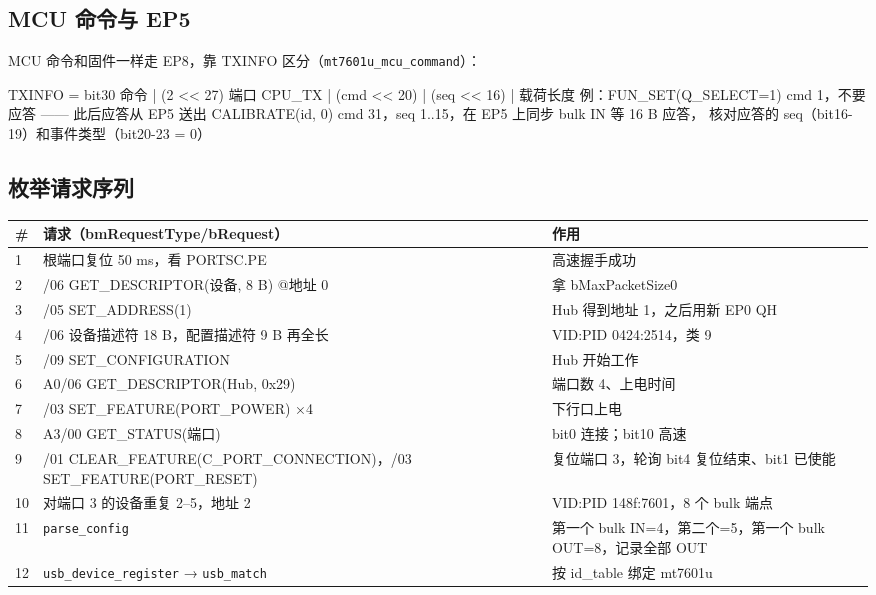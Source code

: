 \documentclass[UTF8,zihao=-4,fontset=none]{ctexart}
\newcommand{\fn}[1]{\texttt{#1}}
\begin{document}
\subsection{MCU 命令与 EP5}

MCU 命令和固件一样走 EP8，靠 TXINFO 区分（\fn{mt7601u\_mcu\_command}）：
\begin{code}
TXINFO = bit30 命令 | (2 << 27) 端口 CPU_TX | (cmd << 20) | (seq << 16) | 载荷长度
例：FUN_SET(Q_SELECT=1)   cmd 1，不要应答 —— 此后应答从 EP5 送出
    CALIBRATE(id, 0)      cmd 31，seq 1..15，在 EP5 上同步 bulk IN 等 16 B 应答，
                          核对应答的 seq（bit16-19）和事件类型（bit20-23 = 0）
\end{code}

\subsection{枚举请求序列}

\begin{longtable}{p{6mm}>{\raggedright\arraybackslash}p{72mm}>{\raggedright\arraybackslash}p{66mm}}
\toprule
\# & 请求（bmRequestType/bRequest） & 作用 \\ \midrule \endhead
1 & 根端口复位 50 ms，看 PORTSC.PE & 高速握手成功 \\
2 & 80/06 GET\_DESCRIPTOR(设备, 8 B) @地址 0 & 拿 bMaxPacketSize0 \\
3 & 00/05 SET\_ADDRESS(1) & Hub 得到地址 1，之后用新 EP0 QH \\
4 & 80/06 设备描述符 18 B，配置描述符 9 B 再全长 & VID:PID 0424:2514，类 9 \\
5 & 00/09 SET\_CONFIGURATION & Hub 开始工作 \\
6 & A0/06 GET\_DESCRIPTOR(Hub, 0x29) & 端口数 4、上电时间 \\
7 & 23/03 SET\_FEATURE(PORT\_POWER) ×4 & 下行口上电 \\
8 & A3/00 GET\_STATUS(端口) & bit0 连接；bit10 高速 \\
9 & 23/01 CLEAR\_FEATURE\newline(C\_PORT\_CONNECTION)，\newline 23/03 SET\_FEATURE(PORT\_RESET) & 复位端口 3，轮询 bit4 复位结束、bit1 已使能 \\
10 & 对端口 3 的设备重复 2--5，地址 2 & VID:PID 148f:7601，8 个 bulk 端点 \\
11 & \fn{parse\_config} & 第一个 bulk IN=4，第二个=5，第一个 bulk OUT=8，记录全部 OUT \\
12 & \fn{usb\_device\_register} → \fn{usb\_match} & 按 id\_table 绑定 mt7601u \\
\bottomrule
\end{longtable}
\end{document}
